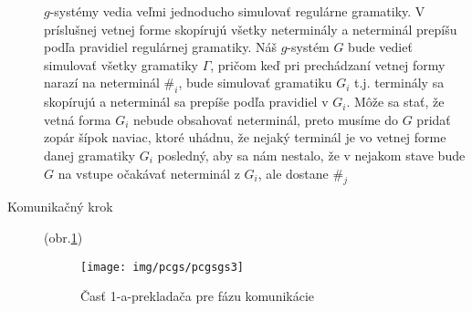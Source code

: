 \begin{dokaz}
\begin{description}
  $g$-systémy vedia veľmi jednoducho simulovať regulárne
  gramatiky. V príslušnej vetnej forme skopírujú všetky
  neterminály a neterminál prepíšu podľa pravidiel regulárnej
  gramatiky. Náš $g$-systém $G$ bude vedieť simulovať všetky gramatiky
  $\Gamma$, pričom keď pri prechádzaní vetnej formy narazí na
  neterminál $\#_i$, bude simulovať gramatiku $G_i$ t.j. terminály
  sa skopírujú a neterminál sa prepíše podľa pravidiel v $G_i$.
  Môže sa stať, že vetná forma $G_i$ nebude obsahovať neterminál,
  preto musíme do $G$ pridať zopár šípok naviac, ktoré uhádnu, že
  nejaký terminál je vo vetnej forme danej gramatiky $G_i$
  posledný, aby sa nám nestalo, že v nejakom stave bude $G$
  na vstupe očakávať neterminál z $G_i$, ale dostane $\#_j$

  \item[Komunikačný krok] (obr.\ref{pcgsgs3})
\begin{figure}[ht]
  \centering
  \texttt{[image: img/pcgs/pcgsgs3]}
  \caption{Časť 1-a-prekladača pre fázu komunikácie}\label{pcgsgs3}
\end{figure}


\end{description}
\end{dokaz}
